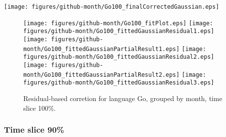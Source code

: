 \begin{center}
{\texttt{[image: figures/github-month/Go100\_finalCorrectedGaussian.eps]}}
\end{center}

\FloatBarrier

\begin{figure}[t]
\centering
{}
{\texttt{[image: figures/github-month/Go100\_fitPlot.eps]}}
{\texttt{[image: figures/github-month/Go100\_fittedGaussianResidual1.eps]}}
{\texttt{[image: figures/github-month/Go100\_fittedGaussianPartialResult1.eps]}}
{\texttt{[image: figures/github-month/Go100\_fittedGaussianResidual2.eps]}}
{\texttt{[image: figures/github-month/Go100\_fittedGaussianPartialResult2.eps]}}
{\texttt{[image: figures/github-month/Go100\_fittedGaussianResidual3.eps]}}
\caption{Residual-based corretion for language Go, grouped by month, time slice 100\%.}
\end{figure}


\FloatBarrier


\subsubsection{Time slice 90\%}

